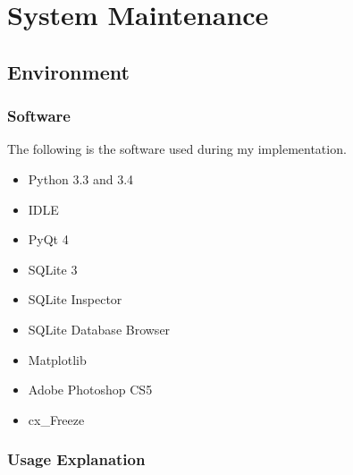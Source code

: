 \chapter{System Maintenance}

\section{Environment}

\subsection{Software}

The following is the software used during my implementation.

\begin{itemize}
\item Python 3.3 and 3.4
\item IDLE
\item PyQt 4
\item SQLite 3
\item SQLite Inspector
\item SQLite Database Browser
\item Matplotlib
\item Adobe Photoshop CS5
\item cx\_Freeze
\end{itemize}

\subsection{Usage Explanation}

